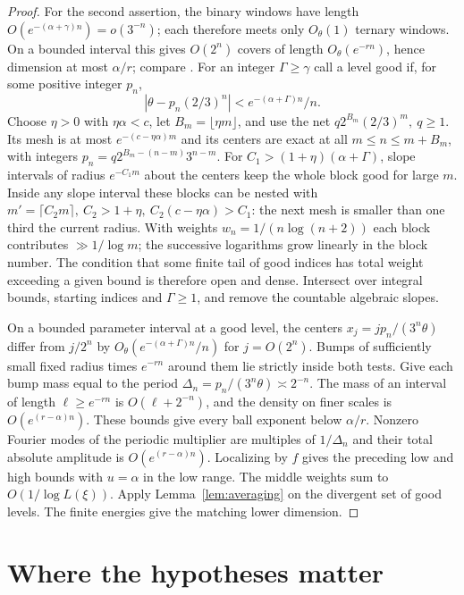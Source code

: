 \documentclass[11pt,a4paper,reqno]{amsart}
\theoremstyle{definition}
\theoremstyle{remark}
\numberwithin{equation}{section}
\begin{document}
\begin{proof}
For the second assertion, the binary windows have length
\(O(e^{-(\alpha+\gamma)n})=o(3^{-n})\); each therefore meets only
\(O_\theta(1)\) ternary windows. On a bounded interval this gives
\(O(2^n)\) covers of length \(O_\theta(e^{-rn})\), hence dimension
at most \(\alpha/r\); compare \cite[\S3.1.1, Lemma~2]{Tapia}.
For an integer \(\Gamma\ge\gamma\) call a level good if, for some
positive integer \(p_n\),
\[
       |\theta-p_n(2/3)^n|<e^{-(\alpha+\Gamma)n}/n .
\]
Choose \(\eta>0\) with \(\eta\alpha<c\), let \(B_m=\lfloor\eta m\rfloor\),
and use the net \(q2^{B_m}(2/3)^m,\ q\ge1\). Its mesh is at most
\(e^{-(c-\eta\alpha)m}\) and its centers are exact at all
\(m\le n\le m+B_m\), with integers \(p_n=q2^{B_m-(n-m)}3^{n-m}\).
For \(C_1>(1+\eta)(\alpha+\Gamma)\), slope intervals of radius
\(e^{-C_1m}\) about the centers keep the whole block good for large
\(m\). Inside any slope interval these blocks can be nested with
\(m'=\lceil C_2m\rceil,\ C_2>1+\eta,\ C_2(c-\eta\alpha)>C_1\):
the next mesh is smaller than one third the current radius. With
weights \(w_n=1/(n\log(n+2))\) each block contributes
\(\gg1/\log m\); the successive logarithms grow linearly in the
block number. The condition that some finite tail of good indices
has total weight exceeding a given bound is therefore open and
dense. Intersect over integral bounds, starting indices and
\(\Gamma\ge1\), and remove the countable algebraic slopes.

On a bounded parameter interval at a good level, the centers
\(x_j=jp_n/(3^n\theta)\) differ from \(j/2^n\) by
\(O_\theta(e^{-(\alpha+\Gamma)n}/n)\) for \(j=O(2^n)\).
Bumps of sufficiently small fixed radius times \(e^{-rn}\) around
them lie strictly inside both tests. Give each bump mass equal to
the period \(\Delta_n=p_n/(3^n\theta)\asymp2^{-n}\).
The mass of an interval of length \(\ell\ge e^{-rn}\) is
\(O(\ell+2^{-n})\), and the density on finer scales is
\(O(e^{(r-\alpha)n})\). These bounds give every ball exponent below
\(\alpha/r\). Nonzero Fourier modes of the periodic multiplier are
multiples of \(1/\Delta_n\) and their total absolute amplitude is
\(O(e^{(r-\alpha)n})\). Localizing by \(f\) gives the preceding
low and high bounds with \(u=\alpha\) in the low range. The middle
weights sum to \(O(1/\log L(\xi))\). Apply Lemma~\ref{lem:averaging}
on the divergent set of good levels. The finite energies give the
matching lower dimension.
\end{proof}
\section{Where the hypotheses matter}\label{sec:limits}
\end{document}
